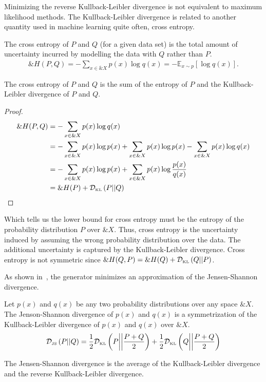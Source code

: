 Minimizing the reverse Kullback-Leibler divergence is not equivalent
to maximum likelihood methods. The Kullback-Leibler divergence is
related to another quantity used in machine learning quite often,
cross entropy.

\begin{definition}
  The \textnormal{\sffamily cross entropy} of $P$ and $Q$ (for a given data set) is the total
  amount of uncertainty incurred by modelling the data with $Q$ rather than $P$.
  \begin{align}
    \&H(P,Q) = - \sum_{x \in \&X} p(x) \log q(x) = -\mathbb{E}_{x \sim p}\left[\log{q(x)}\right].
  \end{align}
\end{definition}

\begin{lemma}
The cross entropy of $P$ and $Q$ is the sum of the entropy of $P$ and the
Kullback-Leibler divergence of $P$ and $Q$.
\end{lemma}
\begin{proof}
\begin{align}
  \label{eq:cross-entropy-alt}
  \&H(P, Q) & = -\sum_{x \in \&X} p(x) \log q(x) \\
            & = -\sum_{x \in \&X} p(x) \log p(x) + \sum_{x \in \&X} p(x) \log p(x) - \sum_{x \in \&X} p(x) \log q(x) \\
            & = -\sum_{x \in \&X} p(x) \log p(x) + \sum_{x \in \&X} p(x) \log {p(x) \over q(x)} \\
            & = \&H(P) + \mathcal{D}_{\text{\tiny KL}}\left( P \middle| \middle| Q \right)
\end{align}
\end{proof}

Which tells us the lower bound for cross entropy must be the entropy of the
probability distribution $P$ over $\&X$. Thus, cross entropy is the uncertainty
induced by assuming the wrong probability distribution over the data. The
additional uncertainty is captured by the Kullback-Leibler divergence. Cross
entropy is not symmetric since $\&H(Q, P) = \&H(Q) + \mathcal{D}_{\text{\tiny KL}}\left( Q \middle| \middle| P \right)$.

As shown in~\cite{ref:goodfellow-original}, the generator minimizes an
approximation of the Jensen-Shannon divergence.

\begin{definition}
  \label{def:jsd}
  Let $p(x)$ and $q(x)$ be any two probability distributions over any
  space $\&X$. The \textnormal{\sffamily Jenson-Shannon divergence} of
  $p(x)$ and $q(x)$ is a symmetrization of the Kullback-Leibler
  divergence of $p(x)$ and $q(x)$ over $\&X$.
  \begin{align}
    \mathcal{D}_{\text{\tiny JS}}\left(P\middle|\middle|Q\right) = {1 \over 2} \mathcal{D}_{\text{\tiny KL}}\left( P \middle| \middle| P + Q \over 2 \right) + {1 \over 2} \mathcal{D}_{\text{\tiny KL}}\left( Q \middle| \middle| P + Q
    \over 2 \right)
  \end{align}
\end{definition}
\begin{remark}
  The Jensen-Shannon divergence is the average of the Kullback-Leibler
  divergence and the reverse Kullback-Leibler divergence.
\end{remark}

